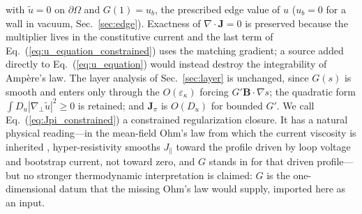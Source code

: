 \documentclass[english]{article}
\newcommand{\bB}{\mathbf{B}}
\newcommand{\bJ}{\mathbf{J}}
\newcommand{\gradperp}{\nabla_{\!\perp}}
\begin{document}
with $\tilde u=0$ on $\partial\Omega$ and $G(1)=u_b$, the prescribed edge value of $u$ ($u_b=0$
for a wall in vacuum, Sec.~\ref{sec:edge}). Exactness of $\nabla\cdot\bJ=0$ is preserved because
the multiplier lives in the constitutive current and the last term of
Eq.~(\ref{eq:u_equation_constrained}) uses the matching gradient; a source added directly to
Eq.~(\ref{eq:u_equation}) would instead destroy the integrability of Amp\`ere's law. The layer
analysis of Sec.~\ref{sec:layer} is unchanged, since $G(s)$ is smooth and enters only through the
$O(\varepsilon_\kappa)$ forcing $G'\bB\cdot\nabla s$; the quadratic form
$\int D_u|\gradperp\tilde u|^{2}\ge0$ is retained; and $\bJ_\pi$ is $O(D_u)$ for bounded $G'$.
We call Eq.~(\ref{eq:Jpi_constrained}) a constrained regularization closure. It has a natural
physical reading---in the mean-field Ohm's law from which the current viscosity is inherited
\cite{boozer1986}, hyper-resistivity smooths $J_\parallel$ toward the profile driven by loop
voltage and bootstrap current, not toward zero, and $G$ stands in for that driven profile---but no
stronger thermodynamic interpretation is claimed: $G$ is the one-dimensional datum that the
missing Ohm's law would supply, imported here as an input.
\end{document}
